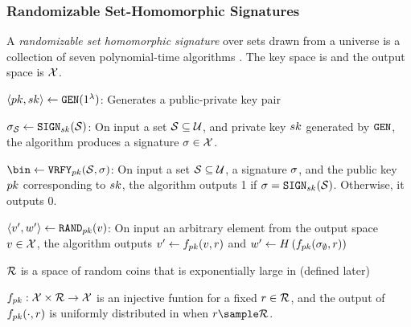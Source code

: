 \subsubsection{Randomizable Set-Homomorphic Signatures}
%

\begin{definition}
	A \textit{randomizable set homomorphic signature} over sets drawn from a universe \universe is a 
	collection of seven polynomial-time algorithms \ourSigSchemeDefn. The key space is \sigKeySpace and the output space is $\mathcal{X}$.
	
	\itemListStart
		\item $\keyPair \assign \keyGen(1^{\secParam})$: Generates a public-private key pair 	

		\item $\genericSig[\genericSetVar] \assign \signingAlg[\privKey](\genericSetVar)$: On input a set 
		$\genericSetVar \subseteq 
		\universe$, and private key $\privKey$ generated by $\keyGen$, the algorithm produces a 
		signature $\genericSig \in \sigOutputSpace$.
		
		
		\item $\bin \assign \verify[\pubKey](\genericSetVar, \genericSig)$:
		On input a set $\genericSetVar \subseteq
		\universe$, a signature $\genericSig$, and the
		public key $\pubKey$ corresponding to $\privKey$,
		the algorithm outputs 1 if $\genericSig =
		\signingAlg[\privKey](\genericSetVar)$. Otherwise, it outputs 0. 
		
		\item $\genericSigPairAlt \assign \randomize[\pubKey](\genericSigPair[1])$: On input an arbitrary element from 
		the output space $\genericSigPair[1] \in \sigOutputSpace$, the algorithm outputs $\genericSigPairAlt[1] \gets \randomizeFn[\pubKey](\genericSigPair[1],\genericRand)$ and $\genericSigPairAlt[2] \assign \ro\left(\randomizeFn[\pubKey](\genericSig[\emptyset], \genericRand)\right)$ 

        


\itemListStart

\item $\genericRandSpace$ is a space of random coins that is exponentially large in \secParam (defined later)
 
 \item $\randomizeFn[\pubKey]: \sigOutputSpace \times \genericRandSpace \rightarrow 
		\sigOutputSpace$ is an injective funtion for a fixed $\genericRand \in \genericRandSpace$, and the output of $\randomizeFn[\pubKey](\cdot, \genericRand)$ is uniformly distributed in \sigOutputSpace when $\genericRand \sample \genericRandSpace$.   
        


\end{definition}
